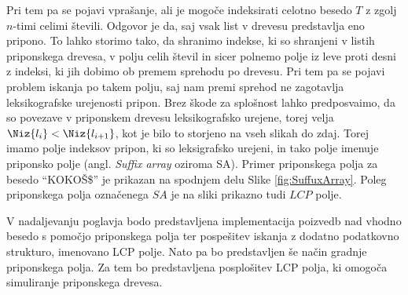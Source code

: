 Pri tem pa se pojavi vprašanje, ali je mogoče indeksirati celotno besedo $T$ z zgolj $n$-timi celimi števili. Odgovor je da, saj vsak list v drevesu predstavlja eno pripono. To lahko storimo tako, da shranimo indekse, ki so shranjeni v listih priponskega drevesa, v polju celih števil in sicer polnemo polje iz leve proti desni z indeksi, ki jih dobimo ob premem sprehodu po drevesu. Pri tem pa se pojavi problem iskanja po takem polju, saj nam premi sprehod ne zagotavlja leksikografske urejenosti pripon. Brez škode za splošnost lahko predposvaimo, da so povezave v priponskem drevesu leksikografsko urejene, torej velja $\Niz{l_i}<\Niz{l_{i+1}}$, kot je bilo to storjeno na vseh slikah do zdaj. Torej imamo polje indeksov pripon, ki so leksigrafsko urejeni, in tako polje imenuje priponsko polje (angl. \textit{Suffix array} oziroma SA). Primer priponskega polja za besedo \enquote{KOKOŠ\$} je prikazan na spodnjem delu Slike \ref{fig:SuffuxArray}. Poleg priponskega polja označenega $SA$ je na sliki prikazno tudi $LCP$ polje.



V nadaljevanju poglavja bodo predstavljena implementacija poizvedb nad vhodno besedo s pomočjo priponskega polja ter pospešitev iskanja z dodatno podatkovno strukturo, imenovano LCP polje. Nato pa bo predstavljen še način gradnje priponskega polja. Za tem bo predstavljena posplošitev LCP polja, ki omogoča simuliranje priponskega drevesa. 




